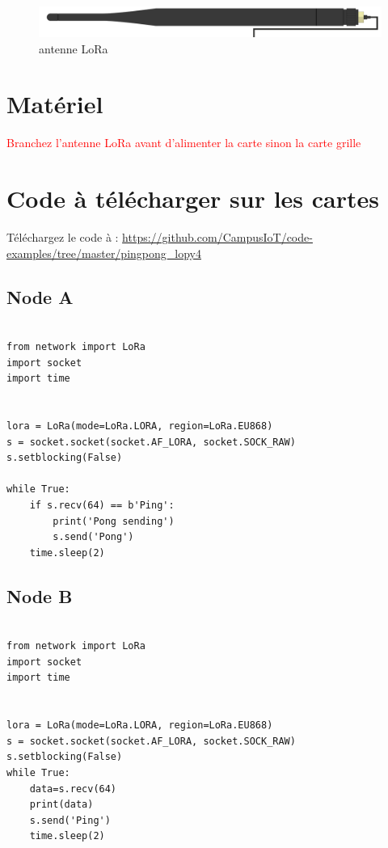 \documentclass{article}
\begin{document}
    \begin{figure}[H]
\begin{center}
\advance\leftskip-3cm
\advance\rightskip-3cm
\includegraphics[keepaspectratio=true,scale=0.2]{lora_antenna.png}
\caption{antenne LoRa}
\label{visina8}
\end{center}\end{figure}


\section{Matériel}
\textcolor{red}{Branchez l'antenne LoRa avant d'alimenter la carte sinon la carte grille}

\section{Code à télécharger sur les cartes}

 Téléchargez le code à : \url{https://github.com/CampusIoT/code-examples/tree/master/pingpong_lopy4} \\


\subsection{Node A}
\begin{verbatim}

from network import LoRa
import socket
import time


lora = LoRa(mode=LoRa.LORA, region=LoRa.EU868)
s = socket.socket(socket.AF_LORA, socket.SOCK_RAW)
s.setblocking(False)

while True:
    if s.recv(64) == b'Ping':
        print('Pong sending')
        s.send('Pong')
    time.sleep(2)

\end{verbatim}




\subsection{Node B}

\begin{verbatim}

from network import LoRa
import socket
import time


lora = LoRa(mode=LoRa.LORA, region=LoRa.EU868)
s = socket.socket(socket.AF_LORA, socket.SOCK_RAW)
s.setblocking(False)
while True:
    data=s.recv(64)
    print(data)
    s.send('Ping')
    time.sleep(2)

\end{verbatim}
\end{document}
